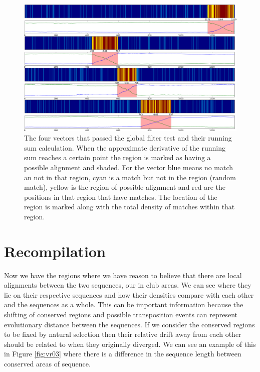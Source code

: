 \documentclass[phd,tocprelim]{cornell}
\begin{document}
 \begin{figure}[htp]%
 \centerline{\includegraphics[width=\textwidth]{figures/velvetrope/localAlignmentsCDF.png}}
 \caption[Second Velvetrope filter]{The four vectors that passed the global filter test and their running sum calculation. When the approximate derivative of the running sum reaches a certain point the region is marked as having a possible alignment and shaded. For the vector blue means no match an not in that region, cyan is a match but not in the region (random match), yellow is the region of possible alignment and red are the positions in that region that have matches. The location of the region is marked along with the total density of matches within that region.}
 	\label{fig:vr02}
 \end{figure}

\section{Recompilation}

Now we have the regions where we have reason to believe that there are local alignments between the two sequences, our in club areas. We can see where they lie on their respective sequences and how their densities compare with each other and the sequences as a whole. This can be important information because the shifting of conserved regions and possible transposition events can represent evolutionary distance between the sequences. If we consider the conserved regions to be fixed by natural selection then their relative drift away from each other should be related to when they originally diverged. We can see an example of this in Figure \ref{fig:vr03} where there is a difference in the sequence length between conserved areas of sequence.
\end{document}
